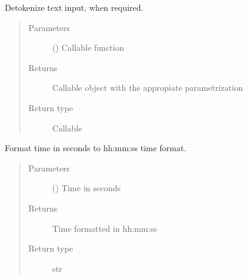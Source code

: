 \documentclass[letterpaper,10pt,english]{sphinxmanual}
\begin{document}

\begin{fulllineitems}
\label{\detokenize{code:utils.detokenize_input}}
\sphinxAtStartPar
Detokenize text input, when required.
\begin{quote}\begin{description}
\item[{Parameters}] \leavevmode
\sphinxAtStartPar
{} () \textendash{} Callable function

\item[{Returns}] \leavevmode
\sphinxAtStartPar
Callable object with the appropiate parametrization

\item[{Return type}] \leavevmode
\sphinxAtStartPar
Callable

\end{description}\end{quote}

\end{fulllineitems}


\begin{fulllineitems}
\label{\detokenize{code:utils.format_time}}
\sphinxAtStartPar
Format time in seconds to hh:mm:ss time format.
\begin{quote}\begin{description}
\item[{Parameters}] \leavevmode
\sphinxAtStartPar
{} () \textendash{} Time in seconds

\item[{Returns}] \leavevmode
\sphinxAtStartPar
Time formatted in hh:mm:ss

\item[{Return type}] \leavevmode
\sphinxAtStartPar
str

\end{description}\end{quote}

\end{fulllineitems}
\end{document}
